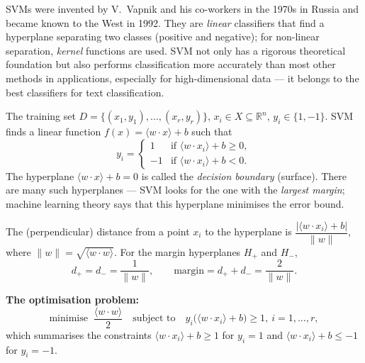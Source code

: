 \documentclass[11pt,a4paper]{article}
\theoremstyle{definition}
\begin{document}
SVMs were invented by V.~Vapnik and his co-workers in the 1970s in Russia and became known to the
West in 1992. They are \emph{linear} classifiers that find a hyperplane separating two classes
(positive and negative); for non-linear separation, \emph{kernel} functions are used. SVM not only
has a rigorous theoretical foundation but also performs classification more accurately than most
other methods in applications, especially for high-dimensional data --- it belongs to the best
classifiers for text classification.

\begin{defbox}
The training set $D=\{(x_1,y_1),\dots,(x_r,y_r)\}$, $x_i\in X\subseteq\mathbb R^n$,
$y_i\in\{1,-1\}$. SVM finds a linear function $f(x)=\langle w\cdot x\rangle+b$ such that
\[ y_i=\begin{cases}1 & \text{if }\langle w\cdot x_i\rangle+b\ge 0,\\
-1 & \text{if }\langle w\cdot x_i\rangle+b<0.\end{cases} \]
The hyperplane $\langle w\cdot x\rangle+b=0$ is called the \emph{decision boundary} (surface).
There are many such hyperplanes --- SVM looks for the one with the \emph{largest margin}; machine
learning theory says that this hyperplane minimises the error bound.

The (perpendicular) distance from a point $x_i$ to the hyperplane is
$\dfrac{|\langle w\cdot x_i\rangle+b|}{\|w\|}$, where
$\|w\|=\sqrt{\langle w\cdot w\rangle}$. For the margin hyperplanes $H_+$ and $H_-$,
\[ d_+=d_-=\frac{1}{\|w\|},\qquad \text{margin}=d_++d_-=\frac{2}{\|w\|}. \]

\textbf{The optimisation problem:}
\[ \text{minimise }\ \frac{\langle w\cdot w\rangle}{2}
   \quad\text{subject to}\quad y_i\big(\langle w\cdot x_i\rangle+b\big)\ge 1,\
   i=1,\dots,r, \]
which summarises the constraints $\langle w\cdot x_i\rangle+b\ge 1$ for $y_i=1$ and
$\langle w\cdot x_i\rangle+b\le -1$ for $y_i=-1$.
\end{defbox}
\end{document}
